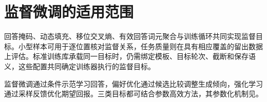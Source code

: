 \documentclass[../textbook.tex]{subfiles}
\begin{document}
\section{监督微调的适用范围}

回答掩码、动态填充、移位交叉熵、有效回答词元聚合与训练循环共同实现监督目标。小型样本可用于逐位置核对监督关系，任务质量则在具有相应覆盖的留出数据上评估。标准训练库承载同一目标时，仍需绑定模板、目标轮次、截断和保存语义，这些配置共同确定训练器执行的监督目标。

监督微调通过条件示范学习回答，偏好优化通过候选比较调整生成倾向，强化学习通过采样反馈优化期望回报。三类目标都可结合参数高效方法，其参数化机制见。




\chapterreferences
\myendchapterdocument
\end{document}
